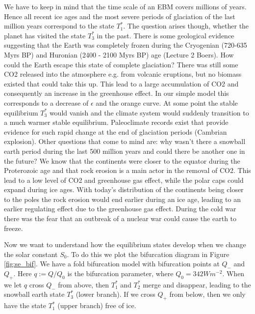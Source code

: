 \documentclass[%
thesis=student,%
coverpage=false,%
titlepage=false,%
headmarks=true, %
english,%
font=libertine, %
math=newpxtx, %
BCOR=5mm,%
coverBCOR=11mm%
]{tumbook}
\begin{document}
We have to keep in mind that the time scale of an EBM covers millions of years. Hence all recent ice ages and the most severe periods of glaciation of the last million years correspond to the state $T_{1}^*$. The question arises though, whether the planet has visited the state $T_{3}^*$ in the past. There is some geological evidence suggesting that the Earth was completely frozen during the Cryogenian (720-635 Myrs BP) and Huronian (2400 - 2100 Myrs BP) age (Lecture 2 Boers). How could the Earth escape this state of complete glaciation? There was still some CO2 released into the atmosphere e.g. from volcanic eruptions, but no biomass existed that could take this up. This lead to a large accumulation of CO2 and consequently an increase in the greenhouse effect. In our simple model this corresponds to a decrease of $\epsilon$ and the orange curve. At some point the stable equilibrium $T_{3}^*$ would vanish and the climate system would suddenly transition to a much warmer stable equilibrium. Paleoclimate records exist that provide evidence for such rapid change at the end of glaciation periods (Cambrian explosion). Other questions that come to mind are: why wasn't there a snowball earth period during the last 500 million years and could there be another one in the future? We know that the continents were closer to the equator during the Proterozoic age and that rock erosion is a main actor in the removal of CO2. This lead to a low level of CO2 and greenhouse gas effect, while the polar caps could expand during ice ages. With today's distribution of the continents being closer to the poles the rock erosion would end earlier during an ice age, leading to an earlier regulating effect due to the greenhouse gas effect. During the cold war there was the fear that an outbreak of a nuclear war could cause the earth to freeze. 

Now we want to understand how the equilibrium states develop when we change the solar constant $S_{0}$. To do this we plot the bifurcation diagram in Figure \ref{fig:se_bif}. We have a fold bifurcation model with bifurcation points at $Q_{-}$ and $Q_{+}$. Here $q := Q/Q_{0}$ is the bifurcation parameter, where $Q_{0} = 342 Wm^{-2}$. When we let $q$ cross $Q_{-}$ from above, then $T_{1}^*$ and $T_{2}^*$ merge and disappear, leading to the snowball earth state $T_{3}^*$ (lower branch). If we cross $Q_{+}$ from below, then we only have the state $T_{1}^*$ (upper branch) free of ice. 
\end{document}

